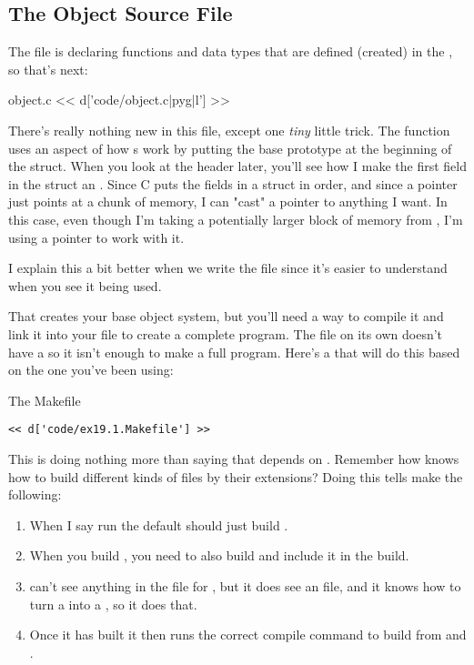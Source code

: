 \subsection{The Object Source File}

The  file is declaring functions and data types that are defined
(created) in the , so that's next:

\begin{code}{object.c}
<< d['code/object.c|pyg|l'] >>
\end{code}

There's really nothing new in this file, except one \emph{tiny} little trick.
The function  uses an aspect of how s work
by putting the base prototype at the beginning of the struct.  When you look
at the  header later, you'll see how I make the first field
in the struct an .  Since C puts the fields in a struct
in order, and since a pointer just points at a chunk of memory, I can
"cast" a pointer to anything I want.  In this case, even though I'm taking
a potentially larger block of memory from , I'm using a
 pointer to work with it.

I explain this a bit better when we write the  file since it's
easier to understand when you see it being used.

That creates your base object system, but you'll need a way to compile it
and link it into your  file to create a complete program.  The
 file on its own doesn't have a  so it isn't
enough to make a full program.  Here's a  that will do this
based on the one you've been using:

\begin{code}{The Makefile}
\begin{lstlisting}
<< d['code/ex19.1.Makefile'] >>
\end{lstlisting}
\end{code}

This  is doing nothing more than saying that 
depends on .  Remember how  knows how to build
different kinds of files by their extensions?  Doing this tells make the
following:

\begin{enumerate}
\item When I say run  the default  should just build
    .
\item When you build , you need to also build 
    and include it in the build.
\item {} can't see anything in the file for , but it does
    see an  file, and it knows how to turn a  into
    a , so it does that.
\item Once it has  built it then runs the correct compile
    command to build  from  and .
\end{enumerate}



